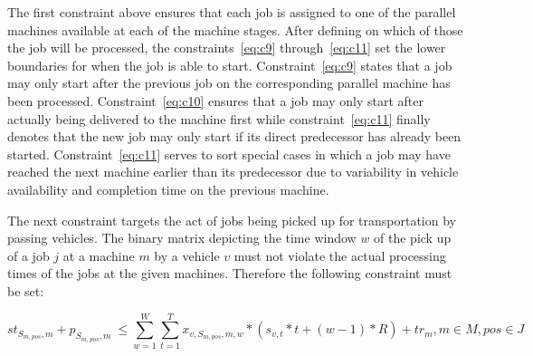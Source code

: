 The first constraint above ensures that each job is assigned to one of the parallel machines available at each of the machine stages. After defining
on which of those the job will be processed, the constraints~\ref{eq:c9} through~\ref{eq:c11} set the lower boundaries for when the job is able to start. Constraint~\ref{eq:c9} states that a job may only start after the previous job on the corresponding parallel machine has been processed. Constraint~\ref{eq:c10} ensures
that a job may only start after actually being delivered to the machine first while constraint~\ref{eq:c11} finally denotes that the new job may only start
if its direct predecessor has already been started. Constraint~\ref{eq:c11} serves to sort special cases in which a job may have reached the next machine
earlier than its predecessor due to variability in vehicle availability and completion time on the previous machine.

The next constraint targets the act of jobs being picked up for transportation by passing vehicles. The binary matrix depicting the
time window \(w\) of the pick up of a job \(j\) at a machine \(m\) by a vehicle \(v\) must not violate the actual processing times of the jobs at
the given machines. Therefore the following constraint must be set:

\begin{equation} \label{eq:c13}
  st_{S_{m,pos},m} + p_{S_{m,pos},m}\> \leq \sum_{w=1}^{W}\sum_{t=1}^{T} x_{v,S_{m,pos},m,w} * (s_{v,t} * t + (w-1) * R) + tr_{m}, m \in M, pos \in J
\end{equation}